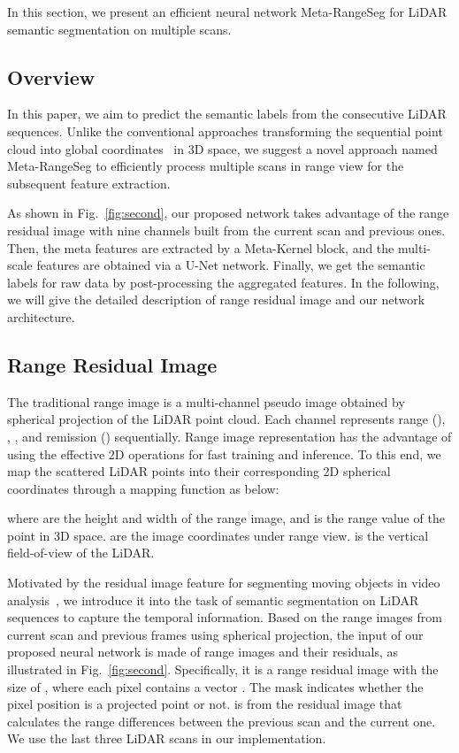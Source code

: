 \documentclass[letterpaper, 10 pt, journal, twoside]{ieeetran}
\begin{document}
\label{sec:main}

In this section, we present an efficient neural network Meta-RangeSeg for LiDAR semantic segmentation on multiple scans.

\subsection{Overview}
In this paper, we aim to predict the semantic labels from the consecutive LiDAR sequences. Unlike the conventional approaches transforming the sequential point cloud into global coordinates~\cite{shi2020spsequencenet, zhu2021cylindrical} in 3D space, we suggest a novel approach named Meta-RangeSeg to efficiently process multiple scans in range view for the subsequent feature extraction. 


As shown in Fig.~\ref{fig:second}, our proposed network takes advantage of the range residual image with nine channels built from the current scan and previous ones. Then, the meta features are extracted by a Meta-Kernel block, and the multi-scale features are obtained via a U-Net network. Finally, we get the semantic labels for raw data by post-processing the aggregated features. In the following, we will give the detailed description of range residual image and our network architecture.

\subsection{Range Residual Image}
The traditional range image is a multi-channel pseudo image obtained by spherical projection of the LiDAR point cloud. Each channel represents range (), , ,  and remission () sequentially. Range image representation has the advantage of using the effective 2D operations for fast training and inference. To this end, we map the scattered LiDAR points into their corresponding 2D spherical coordinates through a mapping function  as below: 

where  are the height and width of the range image, and  is the range value of the point in 3D space.  are the image coordinates under range view.  is the vertical field-of-view of the LiDAR. 

Motivated by the residual image feature for segmenting moving objects in video analysis~\cite{wang2018temporal,chen2021moving}, we introduce it into the task of semantic segmentation on LiDAR sequences to capture the temporal information. Based on the range images from current scan and previous frames using spherical projection, the input of our proposed neural network is made of range images and their residuals, as illustrated in Fig.~\ref{fig:second}. Specifically, it is a range residual image with the size of , where each pixel  contains a vector .  The mask  indicates whether the pixel position is a projected point or not.  is from the residual image  that calculates the range differences between the previous  scan and the current one.  We use the last three LiDAR scans in our implementation.
\end{document}

